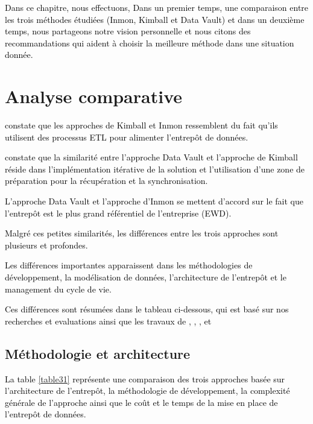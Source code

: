 \documentclass[a4paper,12pt]{report}
\begin{document}
\textcolor{black}{Dans ce chapitre, nous effectuons, Dans un premier temps, une comparaison entre les trois méthodes étudiées (Inmon, Kimball et Data Vault) et dans un deuxième temps, nous partageons notre vision personnelle et nous citons des recommandations qui aident à choisir la meilleure méthode dans une situation donnée.}

\section{Analyse comparative}
\textcolor{black}{\citep{breslin2004data} constate que les approches de Kimball et Inmon ressemblent du fait qu’ils utilisent des processus ETL pour alimenter l’entrepôt de données.}

\textcolor{black}{\citep{12}constate que la similarité entre l’approche Data Vault et l’approche de Kimball réside dans l’implémentation itérative de la solution et l’utilisation d’une zone de préparation pour la récupération et la synchronisation.}

\textcolor{black}{L’approche Data Vault et l’approche d’Inmon se mettent d’accord sur le fait que l’entrepôt est le plus grand référentiel de l’entreprise (EWD).}

\textcolor{black}{Malgré ces petites similarités, les différences entre les trois approches sont plusieurs et profondes.}

\textcolor{black}{Les différences importantes apparaissent dans les méthodologies de développement, la modélisation de données, l’architecture de l’entrepôt et le management du cycle de vie.}

\textcolor{black}{Ces différences sont résumées dans le tableau ci-dessous, qui est basé sur nos recherches et evaluations ainsi que les travaux de \citep{breslin2004data}, \citep{weir2008}, \citep{schneider2014com}, \citep{schalk14} et \citep{13} }
 \subsection{Méthodologie et architecture}
 \textcolor{black}{La table \ref{table31} représente une comparaison des trois approches  basée sur l'architecture de l'entrepôt, la méthodologie de développement, la complexité générale de l'approche ainsi que le coût et le temps de la mise en place de l'entrepôt de données.}
\end{document}
